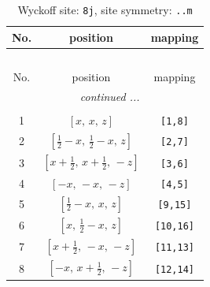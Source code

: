 \documentclass[fleqn,8pt]{jsarticle}
\begin{document}
\begin{longtable}{ccc}
\caption{Wyckoff site: {\tt 8j}, site symmetry: {\tt ..m}}
 \\
 \hline \hline
No. & position & mapping \\ \hline \endfirsthead

\multicolumn{2}{l}{\tablename\ \thetable{}} \\
 \hline \hline
No. & position & mapping \\ \hline \endhead

 \hline \hline
\multicolumn{2}{r}{\footnotesize\it continued ...} \\ \endfoot

 \hline \hline
\multicolumn{2}{r}{} \\ \endlastfoot

1 & $\left[ x,\, x,\, z \right]$ & {\tt [1,8]} \\ \hline
2 & $\left[ \frac{1}{2} - x,\, \frac{1}{2} - x,\, z \right]$ & {\tt [2,7]} \\ \hline
3 & $\left[ x + \frac{1}{2},\, x + \frac{1}{2},\, - z \right]$ & {\tt [3,6]} \\ \hline
4 & $\left[ - x,\, - x,\, - z \right]$ & {\tt [4,5]} \\ \hline
5 & $\left[ \frac{1}{2} - x,\, x,\, z \right]$ & {\tt [9,15]} \\ \hline
6 & $\left[ x,\, \frac{1}{2} - x,\, z \right]$ & {\tt [10,16]} \\ \hline
7 & $\left[ x + \frac{1}{2},\, - x,\, - z \right]$ & {\tt [11,13]} \\ \hline
8 & $\left[ - x,\, x + \frac{1}{2},\, - z \right]$ & {\tt [12,14]} \\
\end{longtable}
\renewcommand{\arraystretch}{1.2}
\end{document}
